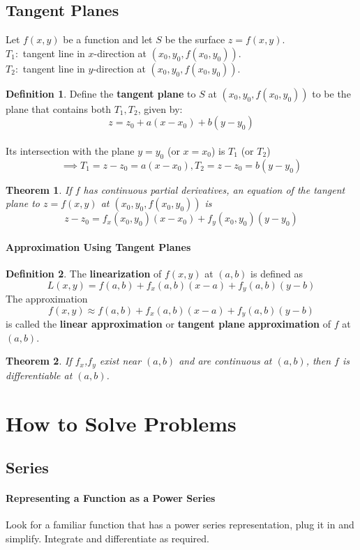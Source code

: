 \documentclass[12 pt]{article}
\newtheorem{thm}{Theorem}
\theoremstyle{definition}
\newtheorem{defn}{Definition}
\begin{document}
\subsection{Tangent Planes} Let $f(x,y)$ be a function and let $S$ be the surface $z=f(x,y)$. 
\\ $T_1:$ tangent line in $x$-direction at $(x_0,y_0,f(x_0,y_0))$.
\\ $T_2:$ tangent line in $y$-direction at $(x_0,y_0,f(x_0,y_0))$.
\begin{defn}
	Define the \textbf{tangent plane} to $S$ at $(x_0,y_0,f(x_0,y_0))$ to be the plane that contains both $T_1,T_2$, given by: $$z=z_0+a(x-x_0)+b(y-y_0)$$
	\\ Its intersection with the plane $y=y_0$ (or $x=x_0$) is $T_1$ (or $T_2$)
	$$\implies T_1=z-z_0=a(x-x_0),T_2=z-z_0=b(y-y_0)$$
\end{defn}
\begin{thm}
	If $f$ has continuous partial derivatives, an equation of the tangent plane to $z=f(x,y)$ at $(x_0,y_0,f(x_0,y_0))$ is $$z-z_0=f_x(x_0,y_0)(x-x_0)+f_y(x_0,y_0)(y-y_0)$$
\end{thm}
\paragraph{Approximation Using Tangent Planes}
\begin{defn}
	The \textbf{linearization} of $f(x,y)$ at $(a,b)$ is defined as $$L(x,y)=f(a,b)+f_x(a,b)(x-a)+f_y(a,b)(y-b)$$
	The approximation $$f(x,y)\approx f(a,b)+f_x(a,b)(x-a)+f_y(a,b)(y-b)$$ is called the \textbf{linear approximation} or \textbf{tangent plane approximation} of $f$ at $(a,b)$.
\end{defn}
\begin{thm}
	If $f_x$,$f_y$ exist near $(a,b)$ and are continuous at $(a,b)$, then $f$ is differentiable at $(a,b)$.
\end{thm}
\section{How to Solve Problems}
\subsection{Series}
\paragraph{Representing a Function as a Power Series} Look for a familiar function that has a power series representation, plug it in and simplify. Integrate and differentiate as required.
\end{document}
